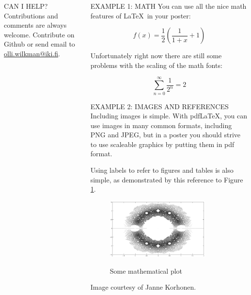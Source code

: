 \documentclass[final]{beamer}
\begin{document}
\begin{frame}[t, fragile]
\begin{columns}[T]
\begin{column}{0.32\linewidth}
\begin{block}{CAN I HELP?}
Contributions and comments are always welcome. Contribute on Github or send email to \url{olli.wilkman@iki.fi}.
\end{block}


\end{column}

\begin{column}{0.32\linewidth}

\begin{block}{EXAMPLE 1: MATH}
	You can use all the nice math features of \LaTeX~in your poster:

	\begin{equation}
		f(x) = \frac{1}{2}\left(\frac{1}{1+x} + 1\right)
	\end{equation}	

	Unfortunately right now there are still some problems with the scaling of the math fonts:

	\begin{equation}
		\sum_{n=0}^\infty \frac{1}{2^n} = 2
	\end{equation}
	


\end{block}
	
	
\begin{block}{EXAMPLE 2: IMAGES AND REFERENCES}
Including images is simple.  With pdf\LaTeX, you can use images in many common formats, including PNG and JPEG, but in a poster you should strive to use scaleable graphics by putting them in pdf format.
	
Using labels to refer to figures and tables is also simple, as demonstrated by this reference to Figure \ref{examplefigure}.

\begin{figure}
\includegraphics[width=0.8\textwidth]{zeros.png}
\label{examplefigure}
\caption{Some mathematical plot}
\end{figure}

Image courtesy of Janne Korhonen.


\end{block}
	
\end{column}

\end{columns}
\end{frame}
\end{document}
